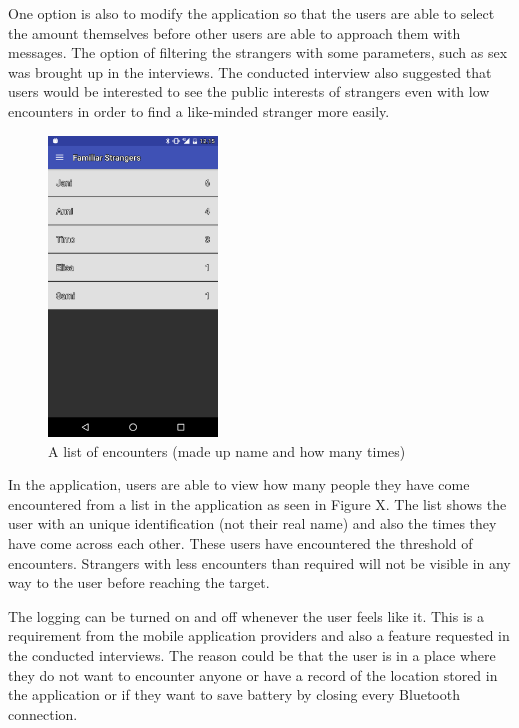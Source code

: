 One option is also to modify the application so that the users are able to select the amount themselves before other users are able to approach them with messages. The option of filtering the strangers with some parameters, such as sex was brought up in the interviews. The conducted interview also suggested that users would be interested to see the public interests of strangers even with low encounters in order to find a like-minded stranger more easily.

\begin{figure}[htb]
	\begin{center}
		\includegraphics[width=0.4\textwidth]{encounters.png}
		\caption{A list of encounters (made up name and how many times)}	
	\end{center}
\end{figure}


In the application, users are able to view how many people they have come encountered from a list in the application as seen in Figure X. The list shows the user with an unique identification (not their real name) and also the times they have come across each other. These users have encountered the threshold of encounters. Strangers with less encounters than required will not be visible in any way to the user before reaching the target.

The logging can be turned on and off whenever the user feels like it. This is a requirement from the mobile application providers and also a feature requested in the conducted interviews. The reason could be that the user is in a place where they do not want to encounter anyone or have a record of the location stored in the application or if they want to save battery by closing every Bluetooth connection.

